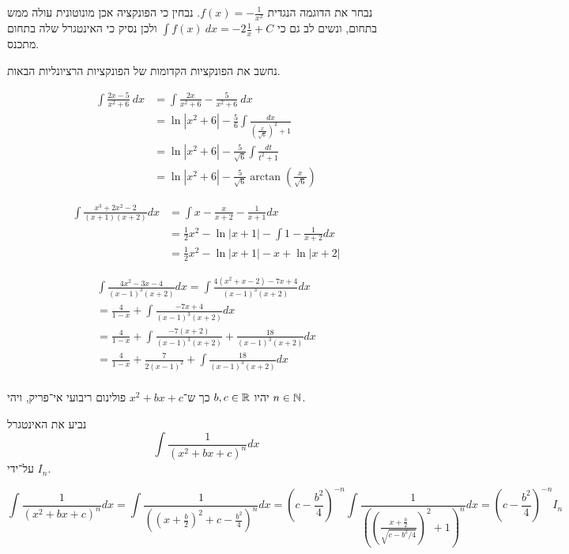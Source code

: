 נבחר את הדוגמה הנגדית $f(x) = -\frac{1}{x^2}$.
נבחין כי הפונקציה אכן מונוטונית עולה ממש בתחום, ונשים לב גם כי $\int f(x)\ dx = -2 \frac{1}{x} + C$ ולכן נסיק כי האינטגרל שלה בתחום מתכנס.

\Question{}
נחשב את הפונקציות הקדומות של הפונקציות הרציונליות הבאות.

\Subquestion{}
\begin{align*}
	\int \frac{2x - 5}{x^2 + 6}\ dx
	& = \int \frac{2x}{x^2 + 6} - \frac{5}{x^2 + 6}\ dx \\
	& = \ln |x^2 + 6| - \frac{5}{6} \int \frac{dx}{{(\frac{x}{\sqrt{6}})}^2 + 1} \\
	& = \ln |x^2 + 6| - \frac{5}{\sqrt{6}} \int \frac{dt}{t^2 + 1} \\
	& = \ln |x^2 + 6| - \frac{5}{\sqrt{6}} \arctan(\frac{x}{\sqrt{6}})
\end{align*}

\Subquestion{}
\begin{align*}
	\int \frac{x^3 + 2x^2 - 2}{(x + 1)(x + 2)}dx
	& = \int x - \frac{x}{x + 2} - \frac{1}{x + 1} dx \\
	& = \frac{1}{2} x^2 - \ln|x + 1| - \int 1 - \frac{1}{x + 2} dx \\
	& = \frac{1}{2} x^2 - \ln|x + 1| - x + \ln|x + 2|
\end{align*}

\Subquestion{}
\begin{align*}
	\int \frac{4x^2 - 3x - 4}{{(x - 1)}^3 (x + 2)} dx
	= \int \frac{4(x^2 + x - 2) - 7x + 4}{{(x - 1)}^3 (x + 2)} dx \\
	= \frac{4}{1 - x} + \int \frac{- 7x + 4}{{(x - 1)}^3 (x + 2)} dx \\
	= \frac{4}{1 - x} + \int \frac{- 7(x + 2)}{{(x - 1)}^3 (x + 2)} + \frac{18}{{(x - 1)}^3 (x + 2)} dx \\
	= \frac{4}{1 - x} + \frac{7}{2{(x - 1)}^2} + \int \frac{18}{{(x - 1)}^3 (x + 2)} dx \\
\end{align*}

\Question{}
יהיו $b, c \in \mathbb{R}$ כך ש־$x^2 + bx + c$ פולינום ריבועי אי־פריק, ויהי $n \in \mathbb{N}$.

\Subquestion{}
נביע את האינטגרל
\[
	\int \frac{1}{{(x^2 + bx + c)}^n} dx
\]
על־ידי $I_n$.

\[
	\int \frac{1}{{(x^2 + bx + c)}^n} dx
	= \int \frac{1}{{({(x + \frac{b}{2})}^2 + c - \frac{b^2}{4})}^n} dx
	= {(c - \frac{b^2}{4})}^{-n} \int \frac{1}{{({(\frac{x + \frac{b}{2}}{\sqrt{c - b^2/4}})}^2 + 1)}^n} dx
	= {(c - \frac{b^2}{4})}^{-n} I_n
\]

